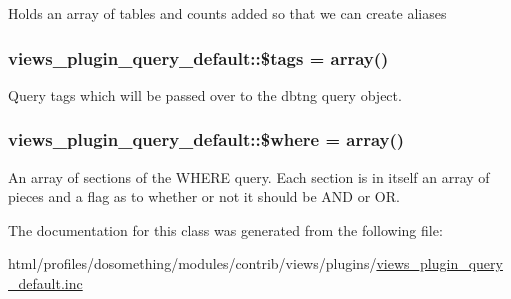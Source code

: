 \label{classviews__plugin__query__default_a11b47da6c7d595ee69d8b9a7e2dffcb2}
Holds an array of tables and counts added so that we can create aliases \hypertarget{classviews__plugin__query__default_a766a1b3fbce56e827df8270df72f3e3b}{
\subsubsection[{\$tags}]{\setlength{\rightskip}{0pt plus 5cm}views\_\-plugin\_\-query\_\-default::\$tags = array()}}
\label{classviews__plugin__query__default_a766a1b3fbce56e827df8270df72f3e3b}
Query tags which will be passed over to the dbtng query object. \hypertarget{classviews__plugin__query__default_a3b78c1aebd049aedc5adc16f545aaa4a}{
\subsubsection[{\$where}]{\setlength{\rightskip}{0pt plus 5cm}views\_\-plugin\_\-query\_\-default::\$where = array()}}
\label{classviews__plugin__query__default_a3b78c1aebd049aedc5adc16f545aaa4a}
An array of sections of the WHERE query. Each section is in itself an array of pieces and a flag as to whether or not it should be AND or OR. 

The documentation for this class was generated from the following file:\begin{DoxyCompactItemize}
\item 
html/profiles/dosomething/modules/contrib/views/plugins/\hyperlink{views__plugin__query__default_8inc}{views\_\-plugin\_\-query\_\-default.inc}\end{DoxyCompactItemize}

